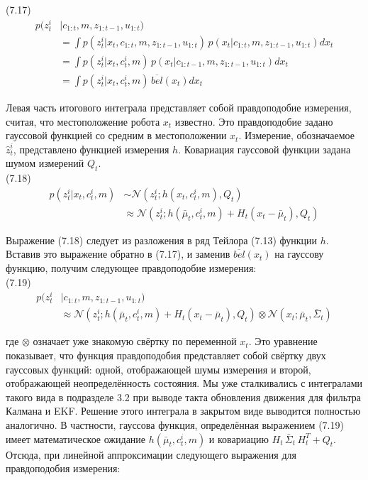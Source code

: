 \documentclass[10pt,a4paper]{article}
\begin{document}
(7.17)
\begin{equation*}
\begin{split}
p(z_t^i&|c_{1:t},m,z_{1:t-1},u_{1:t})\\
&=\int p(z_t^i|x_t,c_{1:t},m,z_{1:t-1},u_{1:t})\,p(x_t|c_{1:t},m,z_{1:t-1},u_{1:t})dx_t \\
&=\int p(z_t^i|x_t,c_t^i,m)\,p(x_t|c_{1:t-1},m,z_{1:t-1},u_{1:t})dx_t\\
&=\int p(z_t^i|x_t,c_t^i,m)\,\overline{bel}(x_t)dx_t
\end{split}
\end{equation*}

Левая часть итогового интеграла представляет собой правдоподобие измерения, считая, что местоположение робота $x_t$ известно. Это правдоподобие задано гауссовой функцией со средним  в местоположении $x_t$. Измерение, обозначаемое $\hat{z}_t^i$, представлено функцией измерения $h$. Ковариация гауссовой функции задана шумом измерений $Q_t$.\\

(7.18)
\begin{equation*}
\begin{split}
p(z_t^i|x_t,c_t^i,m)&\sim\mathcal{N}(z_t^i;h(x_t,c_t^i,m),Q_t)\\
&\approx \mathcal{N}(z_t^i;h(\bar{\mu}_t,c_t^i,m)+H_t(x_t-\bar{\mu}_t),Q_t)
\end{split}
\end{equation*}

Выражение (7.18) следует из разложения в ряд Тейлора (7.13) функции $h$. Вставив это выражение обратно в (7.17), и заменив $\overline{bel}(x_t)$ на гауссову функцию, получим следующее правдоподобие измерения:\\

(7.19)
\begin{equation*}
\begin{split}
p(z_t^i&|c_{1:t},m,z_{1:t-1},u_{1:t})\\
&\approx \mathcal{N}(z_t^i;h(\bar{\mu}_t,c_t^i,m)+H_t(x_t-\bar{\mu}_t),Q_t)\otimes\mathcal{N}(x_t;\bar{\mu}_t,\bar{\varSigma}_t)
\end{split}
\end{equation*}

где $\otimes$ означает уже знакомую свёртку по переменной $x_t$. Это уравнение показывает, что функция правдоподобия представляет собой свёртку двух гауссовых функций: одной, отображающей шумы измерения и второй, отображающей неопределённость состояния. Мы уже сталкивались с интегралами такого вида в подразделе 3.2 при выводе такта обновления движения для фильтра Калмана и EKF. Решение этого интеграла в закрытом виде выводится полностью аналогично. В частности, гауссова функция, определённая выражением (7.19) имеет математическое ожидание $h(\bar{\mu}_t,c_t^i,m)$ и ковариацию $H_t\,\bar{\varSigma}_t\,H_t^T+Q_t$. Отсюда, при линейной аппроксимации следующего выражения для правдоподобия измерения: \\
\end{document}
